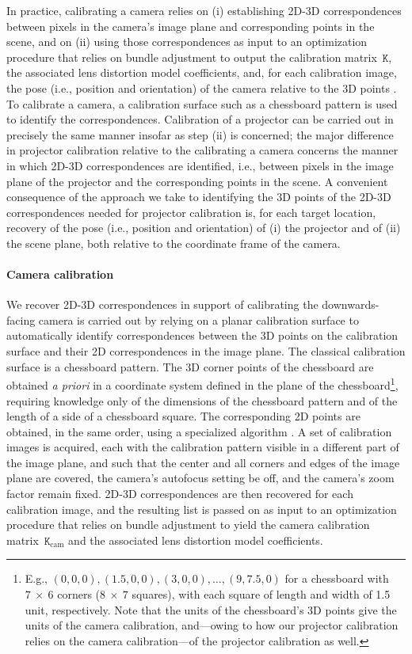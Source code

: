 \documentclass[review]{elsarticle}
\begin{document}
In practice, calibrating a camera relies on (i) establishing 2D-3D correspondences between pixels in the camera's image plane and corresponding points in the scene, and on (ii) using those correspondences as input to an optimization procedure that relies on bundle adjustment \cite{triggs1999bundle} to output the calibration matrix~$\mathtt{K}$, the associated lens distortion model coefficients, and, for each calibration image, the pose (i.e., position and orientation) of the camera relative to the 3D points \cite{Hartley2004,zhang2000flexible}. To calibrate a camera, a calibration surface such as a chessboard pattern is used to identify the correspondences. Calibration of a projector can be carried out in precisely the same manner insofar as step (ii) is concerned; the major difference in projector calibration relative to the calibrating a camera concerns the manner in which 2D-3D correspondences are identified, i.e., between pixels in the image plane of the projector and the corresponding points in the scene. A convenient consequence of the approach we take to identifying the 3D points of the 2D-3D correspondences needed for projector calibration is, for each target location, recovery of the pose (i.e., position and orientation) of (i) the projector and of (ii) the scene plane, both relative to the coordinate frame of the camera.

\paragraph{Camera calibration} We recover 2D-3D correspondences in support of calibrating the downwards-facing camera is carried out by relying on a planar calibration surface to automatically identify correspondences between the 3D points on the calibration surface and their 2D correspondences in the image plane. The classical calibration surface is a chessboard pattern. The 3D corner points of the chessboard are obtained \textit{a priori} in a coordinate system defined in the plane of the chessboard\footnote{E.g., $(0,0,0), (1.5,0,0), (3,0,0), \dots, (9,7.5,0)$ for a chessboard with $7~\times{}~6$ corners ($8~\times{}~7$ squares), with each square of length and width of 1.5 unit, respectively. Note that the units of the chessboard's 3D points give the units of the camera calibration, and---owing to how our projector calibration relies on the camera calibration---of the projector calibration as well.}, requiring knowledge only of the dimensions of the chessboard pattern and of the length of a side of a chessboard square. The corresponding 2D points are obtained, in the same order, using a specialized algorithm \cite{bradski2000opencv}. A set of calibration images is acquired, each with the calibration pattern visible in a different part of the image plane, and such that the center and all corners and edges of the image plane are covered, the camera's autofocus setting be off, and the camera's zoom factor remain fixed. 2D-3D correspondences are then recovered for each calibration image, and the resulting list is passed on as input to an optimization procedure that relies on bundle adjustment to yield the camera calibration matrix~$\mathtt{K}_\text{cam}$ and the associated lens distortion model coefficients. 
\end{document}
